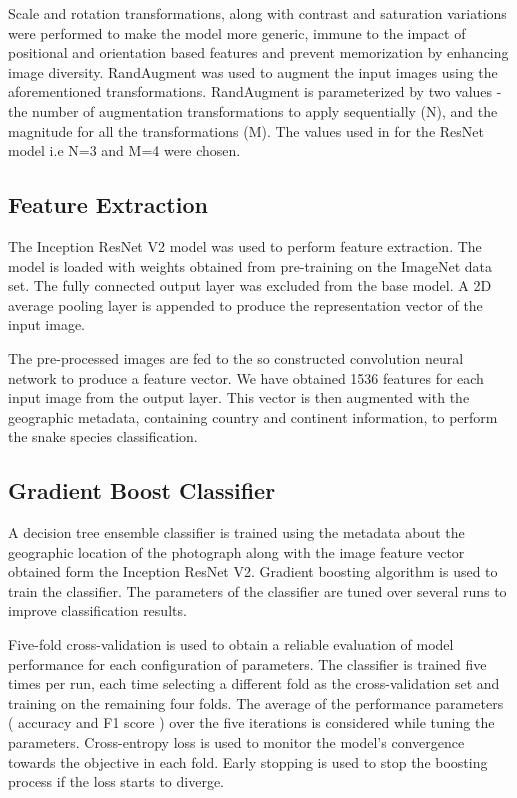 \documentclass[
]{ceurart}
\begin{document}
Scale and rotation transformations, along with contrast and saturation variations were performed to make the model more generic, immune to the impact of positional and orientation based features and prevent memorization by enhancing image diversity. RandAugment \cite{rand_augment} was used to augment the input images using the aforementioned transformations. RandAugment is parameterized by two values - the number of augmentation transformations to apply sequentially (N), and the magnitude for all the transformations (M). The values used in \cite{rand_augment} for the ResNet model i.e N=3 and M=4 were chosen. 

\subsection{Feature Extraction}

The Inception ResNet V2 model was used to perform feature extraction. The model is loaded with weights obtained from pre-training on the ImageNet data set. The fully connected output layer was excluded from the base model. A 2D average pooling layer is appended to produce the representation vector of the input image.

The pre-processed images are fed to the so constructed convolution neural network to produce a feature vector. We have obtained 1536 features for each input image from the output layer. This vector is then augmented with the geographic metadata, containing country and continent information, to perform the snake species classification.

\subsection{Gradient Boost Classifier}

A decision tree ensemble classifier is trained using the metadata about the geographic location of the photograph along with the image feature vector obtained form the Inception ResNet V2. Gradient boosting algorithm is used to train the classifier. The parameters of the classifier are tuned over several runs to improve classification results. 

Five-fold cross-validation is used to obtain a reliable evaluation of model performance for each configuration of parameters. The classifier is trained five times per run, each time selecting a different fold as the cross-validation set and training on the remaining four folds. The average of the performance parameters ( accuracy and F1 score ) over the five iterations is considered while tuning the parameters. Cross-entropy loss is used to monitor the model's convergence towards the objective in each fold. Early stopping is used to stop the boosting process if the loss starts to diverge.
\end{document}
